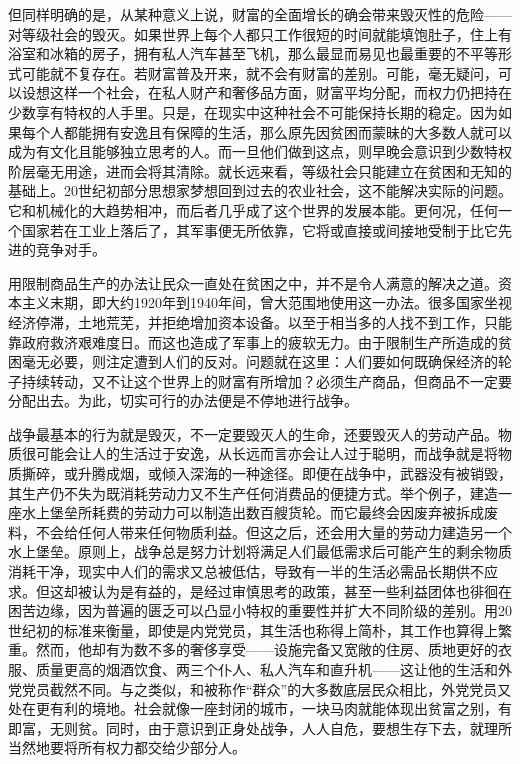 但同样明确的是，从某种意义上说，财富的全面增长的确会带来毁灭性的危险------对等级社会的毁灭。如果世界上每个人都只工作很短的时间就能填饱肚子，住上有浴室和冰箱的房子，拥有私人汽车甚至飞机，那么最显而易见也最重要的不平等形式可能就不复存在。若财富普及开来，就不会有财富的差别。可能，毫无疑问，可以设想这样一个社会，在私人财产和奢侈品方面，财富平均分配，而权力仍把持在少数享有特权的人手里。只是，在现实中这种社会不可能保持长期的稳定。因为如果每个人都能拥有安逸且有保障的生活，那么原先因贫困而蒙昧的大多数人就可以成为有文化且能够独立思考的人。而一旦他们做到这点，则早晚会意识到少数特权阶层毫无用途，进而会将其清除。就长远来看，等级社会只能建立在贫困和无知的基础上。20世纪初部分思想家梦想回到过去的农业社会，这不能解决实际的问题。它和机械化的大趋势相冲，而后者几乎成了这个世界的发展本能。更何况，任何一个国家若在工业上落后了，其军事便无所依靠，它将或直接或间接地受制于比它先进的竞争对手。

用限制商品生产的办法让民众一直处在贫困之中，并不是令人满意的解决之道。资本主义末期，即大约1920年到1940年间，曾大范围地使用这一办法。很多国家坐视经济停滞，土地荒芜，并拒绝增加资本设备。以至于相当多的人找不到工作，只能靠政府救济艰难度日。而这也造成了军事上的疲软无力。由于限制生产所造成的贫困毫无必要，则注定遭到人们的反对。问题就在这里：人们要如何既确保经济的轮子持续转动，又不让这个世界上的财富有所增加？必须生产商品，但商品不一定要分配出去。为此，切实可行的办法便是不停地进行战争。

战争最基本的行为就是毁灭，不一定要毁灭人的生命，还要毁灭人的劳动产品。物质很可能会让人的生活过于安逸，从长远而言亦会让人过于聪明，而战争就是将物质撕碎，或升腾成烟，或倾入深海的一种途径。即便在战争中，武器没有被销毁，其生产仍不失为既消耗劳动力又不生产任何消费品的便捷方式。举个例子，建造一座水上堡垒所耗费的劳动力可以制造出数百艘货轮。而它最终会因废弃被拆成废料，不会给任何人带来任何物质利益。但这之后，还会用大量的劳动力建造另一个水上堡垒。原则上，战争总是努力计划将满足人们最低需求后可能产生的剩余物质消耗干净，现实中人们的需求又总被低估，导致有一半的生活必需品长期供不应求。但这却被认为是有益的，是经过审慎思考的政策，甚至一些利益团体也徘徊在困苦边缘，因为普遍的匮乏可以凸显小特权的重要性并扩大不同阶级的差别。用20世纪初的标准来衡量，即使是内党党员，其生活也称得上简朴，其工作也算得上繁重。然而，他却有为数不多的奢侈享受------设施完备又宽敞的住房、质地更好的衣服、质量更高的烟酒饮食、两三个仆人、私人汽车和直升机------这让他的生活和外党党员截然不同。与之类似，和被称作``群众''的大多数底层民众相比，外党党员又处在更有利的境地。社会就像一座封闭的城市，一块马肉就能体现出贫富之别，有即富，无则贫。同时，由于意识到正身处战争，人人自危，要想生存下去，就理所当然地要将所有权力都交给少部分人。

